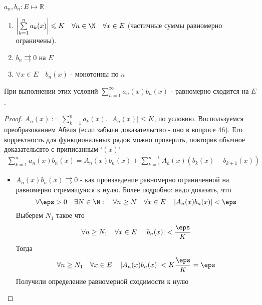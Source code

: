 
\begin{theorem} \thmslashn
  
  $a_n, b_n : E\mapsto \mathbb{R}$
  \begin{enumerate}
  \item
    $\left|\sum\limits_{k = 1}^{n}{a_k(x)}\right| \leqslant K\quad \forall n \in \N \quad \forall x \in E$ (частичные суммы равномерно ограничены).
  \item
    $b_n \rightrightarrows 0$ на $E$
  \item
    $\forall x \in E \quad  b_n(x)$ - монотонны по $n$
  \end{enumerate}
  При выполнении этих условий $\sum\limits_{n = 1}^{\infty}{a_n(x)b_n(x)}$ - равномерно сходится на $E$.

  \begin{proof} \thmslashn
    
    $A_n(x) := \sum\limits_{k = 1}^{n}{a_k(x)}$. $\left|A_n(x)\right|\leqslant K$, по условию. Воспользуемся преобразованием Абеля (если забыли доказательство - оно в вопросе 46). Его корректность для функциональных рядов можно проверить, повторив обычное доказательсвто с приписанным '$(x)$'
    \[\begin{aligned}
      \sum\limits_{k = 1}^{n}{a_n(x)b_n(x)} = A_n(x)b_n(x) + \sum\limits_{k = 1}^{n-1}{A_k(x)(b_k(x) - b_{k+1}(x))}
    \end{aligned}\]
    \begin{itemize}
    \item
      $A_n(x)b_n(x) \rightrightarrows 0$ - как произведение равномерно ограниченной на равномерно стремящуюся к нулю. Более подробно: надо доказать, что 
      \[ \forall \eps > 0 \quad \exists N \in \N : \quad \forall n \ge N \quad \forall x \in E \quad \left| A_n(x)b_n(x) \right| < \eps \]
      Выберем $N_1$ такое что
      \[ \forall n \ge N_1 \quad \forall x \in E \quad \left|b_n(x)\right| < \frac{\eps}{K} \]
      Тогда 
      \[ \forall n \ge N_1 \quad \forall x \in E \quad \left|A_n(x) b_n(x)\right| < K\frac{\eps}{K} = \eps \]
      Получили определение равномерной сходимости к нулю
      

\end{itemize}
\end{proof}
\end{theorem}
